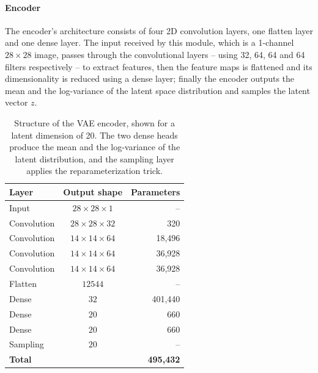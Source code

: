 \paragraph{Encoder}
\hfill \break
The encoder’s architecture consists of four 2D convolution layers, one flatten layer and one dense layer. The input received by this module, which is a 1-channel $28\times28$ image, passes through the convolutional layers -- using 32, 64, 64 and 64 filters respectively -- to extract features, then the feature maps is flattened and its dimensionality is reduced using a dense layer; finally the encoder outputs the mean and the log-variance of the latent space distribution and samples the latent vector $z$.
\begin{table}[H]
    \centering
    \begin{tabular}{l c r}
    \textbf{Layer} & \textbf{Output shape} & \textbf{Parameters} \\
    \hline
    Input & \( 28 \times 28 \times 1 \) & -- \\
    Convolution & \( 28 \times 28 \times 32 \) & 320 \\
    Convolution & \( 14 \times 14 \times 64 \) & 18{,}496 \\
    Convolution & \( 14 \times 14 \times 64 \) & 36{,}928 \\
    Convolution & \( 14 \times 14 \times 64 \) & 36{,}928 \\
    Flatten & \( 12544 \) & -- \\
    Dense & \( 32 \) & 401{,}440 \\
    Dense & \( 20 \) & 660 \\
    Dense & \( 20 \) & 660 \\
    Sampling & \( 20 \) & -- \\
    \hline
    \textbf{Total} & & \textbf{495{,}432} \\
    \end{tabular}
    \caption{Structure of the VAE encoder, shown for a latent dimension of 20. The two dense heads produce the mean and the log-variance of the latent distribution, and the sampling layer applies the reparameterization trick.}
    \label{tab:vae encoder}
\end{table}
